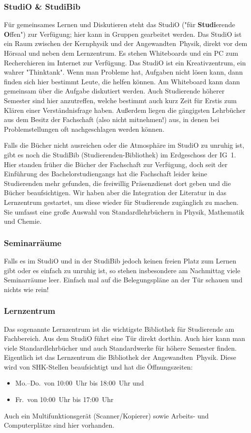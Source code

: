 \begin{multicols}{2}
\subsubsection*{StudiO \& StudiBib}
Für gemeinsames Lernen und Diskutieren steht das StudiO ("für \textbf{Studi}erende \textbf{O}ffen") zur Verfügung; hier kann in Gruppen gearbeitet werden. Das StudiO ist ein Raum zwischen der Kernphysik und der Angewandten~Physik, direkt vor dem Hörsaal und neben dem Lernzentrum. Es stehen Whiteboards und ein PC zum Recherchieren im Internet zur Verfügung. Das StudiO ist ein Kreativzentrum, ein wahrer "Thinktank". Wenn man Probleme hat, Aufgaben nicht lösen kann, dann finden sich hier bestimmt Leute, die helfen können. Am Whiteboard kann dann gemeinsam über die Aufgabe diskutiert werden. Auch Studierende höherer Semester sind hier anzutreffen, welche bestimmt auch kurz Zeit für Erstis zum Klären einer Verständnisfrage haben. Außerdem liegen die gängigsten Lehrbücher aus dem Besitz der Fachschaft (also nicht mitnehmen!) aus, in denen bei Problemstellungen oft nachgeschlagen werden können.

Falls die Bücher nicht ausreichen oder die Atmosphäre im StudiO zu unruhig ist, gibt es noch die StudiBib (Studierenden-Bibliothek) im Erdgeschoss der IG~1. Hier standen früher die Bücher der Fachschaft zur Verfügung, doch seit der Einführung des Bachelorstudiengangs hat die Fachschaft leider keine Studierenden mehr gefunden, die freiwillig Präsenzdienst dort geben und die Bücher beaufsichtigen. Wir haben aber die Integration der Literatur in das Lernzentrum gestartet, um diese wieder für Studierende zugänglich zu machen. Sie umfasst eine große Auswahl von Standardlehrbüchern in Physik, Mathematik und Chemie.

\subsubsection*{Seminarräume}
Falls es im StudiO und in der StudiBib jedoch keinen freien Platz zum Lernen gibt oder es einfach zu unruhig ist, so stehen insbesondere am Nachmittag viele Seminarräume leer. Einfach mal auf die Belegungspläne an der Tür schauen und nichts wie rein!

\subsubsection*{Lernzentrum}
Das sogenannte Lernzentrum ist die wichtigste Bibliothek für Studierende am Fachbereich. Aus dem StudiO führt eine Tür direkt dorthin. Auch hier kann man viele Standardlehrbücher und auch Standardwerke für höhere Semester finden. Eigentlich ist das Lernzentrum die Bibliothek der Angewandten~Physik. Diese wird von SHK-Stellen beaufsichtigt und hat die Öffnungszeiten:
\begin{itemize}
\item Mo.--Do.\ von 10:00~Uhr bis 18:00~Uhr und
\item Fr.\ von 10:00~Uhr bis 17:00~Uhr
\end{itemize}
Auch ein Multifunktionsgerät (Scanner/Kopierer) sowie Arbeits- und Computerplätze sind hier vorhanden.


\end{multicols}
